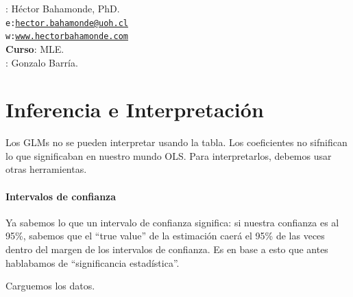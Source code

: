 \documentclass[onesided]{article}\usepackage[]{graphicx}\usepackage[]{color}
\begin{document}











\hspace{-5mm}{\bf Profesor}: H\'ector Bahamonde, PhD.\\
\texttt{e:}\href{mailto:hector.bahamonde@uoh.cl}{\texttt{hector.bahamonde@uoh.cl}}\\
\texttt{w:}\href{http://www.hectorbahamonde.com}{\texttt{www.hectorbahamonde.com}}\\
{\bf Curso}: MLE.\\
\hspace{-5mm}{\bf TA}: Gonzalo Barr\'ia.

\section{Inferencia e Interpretaci\'on}

Los GLMs no se pueden interpretar usando la tabla. Los coeficientes no sifnifican lo que significaban en nuestro mundo OLS. Para interpretarlos, debemos usar otras herramientas. 


\paragraph{Intervalos de confianza}

Ya sabemos lo que un intervalo de confianza significa: si nuestra confianza es al 95\%, sabemos que el ``true value'' de la estimaci\'on caer\'a el 95\% de las veces dentro del margen de los intervalos de confianza. Es en base a esto que antes hablabamos de ``significancia estad\'istica''.

Carguemos los datos.
\end{document}
